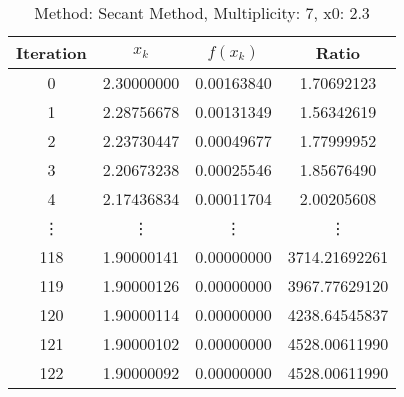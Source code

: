 \begin{table}
\centering
\caption{Method: Secant Method, Multiplicity: 7, x0: 2.3}
\label{tab:table_Secant_Method_7_2_3}
\begin{tabular}{c c c c}
\toprule
Iteration &      $x_k$ &   $f(x_k)$ &         Ratio \\
\midrule
        0 & 2.30000000 & 0.00163840 &    1.70692123 \\
        1 & 2.28756678 & 0.00131349 &    1.56342619 \\
        2 & 2.23730447 & 0.00049677 &    1.77999952 \\
        3 & 2.20673238 & 0.00025546 &    1.85676490 \\
        4 & 2.17436834 & 0.00011704 &    2.00205608 \\
   \vdots &     \vdots &     \vdots &        \vdots \\
      118 & 1.90000141 & 0.00000000 & 3714.21692261 \\
      119 & 1.90000126 & 0.00000000 & 3967.77629120 \\
      120 & 1.90000114 & 0.00000000 & 4238.64545837 \\
      121 & 1.90000102 & 0.00000000 & 4528.00611990 \\
      122 & 1.90000092 & 0.00000000 & 4528.00611990 \\
\bottomrule
\end{tabular}
\end{table}
